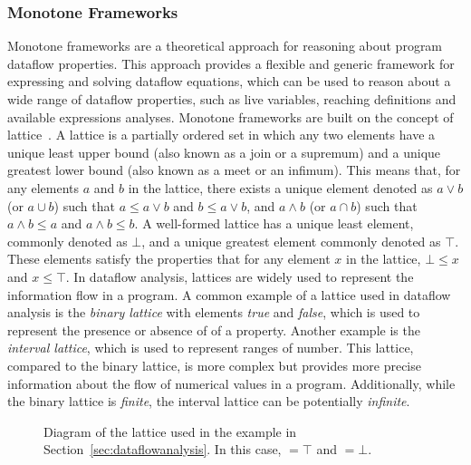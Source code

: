\subsubsection*{Monotone Frameworks}
\label{sec:monotoneframeworks}
Monotone frameworks are a theoretical approach for reasoning
about program dataflow properties.
This approach provides a flexible and generic framework for expressing and solving
dataflow equations, which can be used to reason about a wide range of dataflow
properties, such as live variables, reaching definitions and available expressions analyses.
Monotone frameworks are built on the concept of lattice~\cite{Donnellan1968}.
A lattice is a partially ordered set in which any two elements have a unique least
upper bound (also known as a join or a supremum) and a unique greatest lower bound
(also known as a meet or an infimum). This means that, for any elements $a$ and $b$ in
the lattice, there exists a unique element denoted as  $a \vee b$  (or  $a \cup b$)
such that  $a \leq a \vee b$  and  $ b \leq a \vee b$, and  $a \wedge b$
(or  $ a\cap b$) such that  $ a\wedge b\leq a$  and  $a \wedge b\leq b$.
A well-formed lattice has a unique least element, commonly denoted as $\bot$,
and a unique greatest element commonly denoted as $\top$. These elements satisfy
the properties that for any element $x$ in the lattice, $\bot \leq x$ and $x \leq \top$.
In dataflow analysis, lattices are widely used to represent the information flow in a program.
A common example of a lattice used in dataflow analysis is the \emph{binary lattice} with 
elements \emph{true} and \emph{false}, which is used to represent the presence or absence of
of a property. Another example is the \emph{interval lattice}, which is used 
to represent ranges of number. This lattice, compared to the binary lattice, is more 
complex but provides more precise information about the flow of numerical values 
in a program. Additionally, while the binary lattice is \emph{finite}, the interval lattice can 
be potentially \emph{infinite}.
\begin{figure}
     \begin{center}
    \caption{\label{fig:lattice}Diagram of the lattice used in the example in Section~\ref{sec:dataflowanalysis}.
    In this case,  $= \top$ and $= \bot$.}
  \end{center}
\end{figure}


